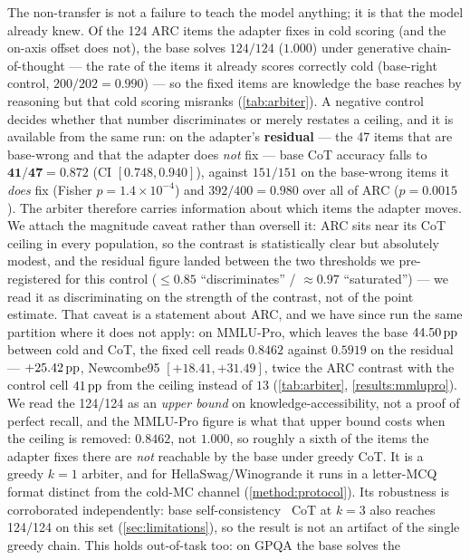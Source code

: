 The non-transfer is not a failure to teach the model anything; it is that the model
already knew. Of the 124 ARC items the adapter fixes in cold scoring (and the
on-axis offset does not), the base solves $124/124$ ($1.000$) under generative
chain-of-thought --- the rate of the items it already scores correctly cold
(base-right control, $200/202 = 0.990$) --- so the fixed items are knowledge the
base reaches by reasoning but that cold scoring misranks (\cref{tab:arbiter}). A
negative control decides whether that number discriminates or merely restates a
ceiling, and it is available from the same run: on the adapter's \textbf{residual}
--- the 47 items that are base-wrong and that the adapter does \emph{not} fix ---
base CoT accuracy falls to $\mathbf{41/47 = 0.872}$ (CI $[0.748, 0.940]$), against
$151/151$ on the base-wrong items it \emph{does} fix (Fisher
$p=1.4\times10^{-4}$) and $392/400 = 0.980$ over all of ARC ($p=0.0015$). The
arbiter therefore carries information about which items the adapter moves. We attach
the magnitude caveat rather than oversell it: ARC sits near its CoT ceiling in every
population, so the contrast is statistically clear but absolutely modest, and the
residual figure landed between the two thresholds we pre-registered for this control
(${\leq}0.85$ ``discriminates'' / ${\approx}0.97$ ``saturated'') --- we read it as
discriminating on the strength of the contrast, not of the point estimate. That
caveat is a statement about ARC, and we have since run the same partition where it
does not apply: on MMLU-Pro, which leaves the base $44.50\,\mathrm{pp}$ between cold and CoT,
the fixed cell reads $0.8462$ against $0.5919$ on the residual --- $+25.42\,\mathrm{pp}$,
Newcombe95 $[+18.41, +31.49]$, twice the ARC contrast with the control cell $41\,\mathrm{pp}$
from the ceiling instead of $13$ (\cref{tab:arbiter}, \cref{results:mmlupro}). We read
the 124/124 as an \emph{upper bound} on knowledge-accessibility, not a proof of
perfect recall, and the MMLU-Pro figure is what that upper bound costs when the
ceiling is removed: $0.8462$, not $1.000$, so roughly a sixth of the items the
adapter fixes there are \emph{not} reachable by the base under greedy CoT. It is a
greedy $k{=}1$ arbiter, and for HellaSwag/Winogrande it runs
in a letter-MCQ format distinct from the cold-MC channel (\cref{method:protocol}).
Its robustness is corroborated independently: base self-consistency~\citep{SelfConsistency} CoT at $k{=}3$
also reaches 124/124 on this set (\cref{sec:limitations}), so the result is not an artifact
of the single greedy chain. This holds out-of-task too: on GPQA the base solves the

